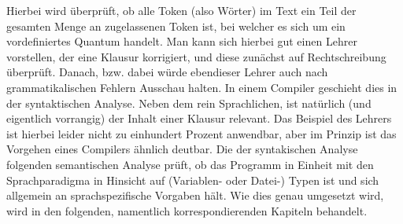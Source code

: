 \documentclass{standalone}
\begin{document}
Hierbei wird überprüft, ob alle Token (also Wörter) im Text ein Teil der gesamten Menge an zugelassenen Token ist, bei welcher es sich um ein vordefiniertes Quantum handelt. Man kann sich hierbei gut einen Lehrer vorstellen, der eine Klausur korrigiert, und diese zunächst auf Rechtschreibung überprüft. Danach, bzw. dabei würde ebendieser Lehrer auch nach grammatikalischen Fehlern Ausschau halten. In einem Compiler geschieht dies in der syntaktischen Analyse. Neben dem rein Sprachlichen, ist natürlich (und eigentlich vorrangig) der Inhalt einer Klausur relevant. Das Beispiel des Lehrers ist hierbei leider nicht zu einhundert Prozent anwendbar, aber im Prinzip ist das Vorgehen eines Compilers ähnlich deutbar. Die der syntakischen Analyse folgenden semantischen Analyse prüft, ob das Programm in Einheit mit den Sprachparadigma in Hinsicht auf (Variablen- oder Datei-) Typen ist und sich allgemein an sprachspezifische Vorgaben hält. Wie dies genau umgesetzt wird, wird in den folgenden, namentlich korrespondierenden Kapiteln behandelt. 

\end{document}
